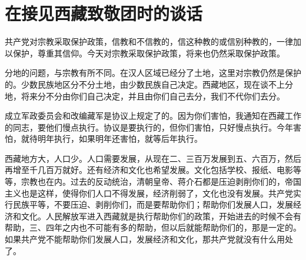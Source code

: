 \section[在接见西藏致敬团时的谈话（一九五一年十月八日）]{在接见西藏致敬团时的谈话}


共产党对宗教采取保护政策，信教和不信教的，信这种教的或信别种教的，一律加以保护，尊重其信仰。今天对宗教采取保护政策，将来也仍然采取保护政策。

分地的问题，与宗教有所不同。在汉人区域已经分了土地，这里对宗教仍然是保护的。少数民族地区分不分土地，由少数民族自己决定。西藏地区，现在谈不上分地，将来分不分由你们自己决定，并且由你们自己去分，我们不代你们去分。

成立军政委员会和改编藏军是协议上规定了的。因为你们害怕，我通知在西藏工作的同志，要他们慢点执行。协议是要执行的，但你们害怕，只好慢点执行。今年害怕，就待明年执行，如果明年还害怕，就等后年执行。

西藏地方大，人口少。人口需要发展，从现在二、三百万发展到五、六百万，然后再增至千几百万就好。还有经济和文化也希望发展。文化包括学校、报纸、电影等等，宗教也在内。过去的反动统治，清朝皇帝、蒋介石都是压迫剥削你们的，帝国主义也是这样，使得你们人口不得发展，经济削弱了，文化也没有发展。共产党实行民族平等，不要压迫、剥削你们，而是要帮助你们；帮助你们发展人口，发展经济和文化。人民解放军进入西藏就是执行帮助你们的政策，开始进去的时候不会有帮助，三、四年之内也不可能有多的帮助，但以后就能帮助你们的，那是一定的。如果共产党不能帮助你们发展人口，发展经济和文化，那共产党就没有什么用处了。


